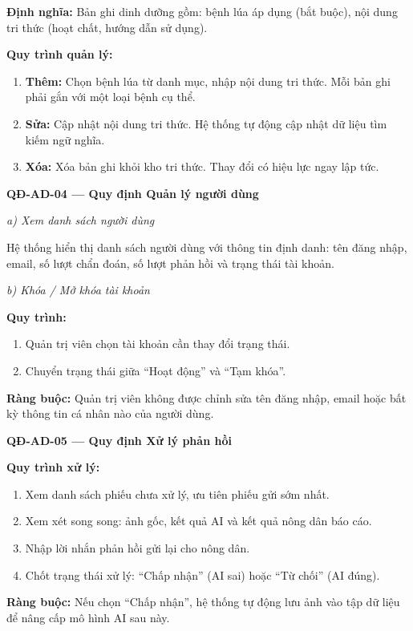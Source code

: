 \documentclass[12pt,a4paper]{article}
\begin{document}
\noindent\textbf{Định nghĩa:} Bản ghi dinh dưỡng gồm: bệnh lúa áp dụng (bắt buộc), nội dung tri thức (hoạt chất, hướng dẫn sử dụng).

\noindent\textbf{Quy trình quản lý:}
\begin{enumerate}
    \item \textbf{Thêm:} Chọn bệnh lúa từ danh mục, nhập nội dung tri thức. Mỗi bản ghi phải gắn với một loại bệnh cụ thể.
    \item \textbf{Sửa:} Cập nhật nội dung tri thức. Hệ thống tự động cập nhật dữ liệu tìm kiếm ngữ nghĩa.
    \item \textbf{Xóa:} Xóa bản ghi khỏi kho tri thức. Thay đổi có hiệu lực ngay lập tức.
\end{enumerate}

\vspace{0.3cm}
\noindent\textbf{QĐ-AD-04 --- Quy định Quản lý người dùng}

\noindent\textit{a) Xem danh sách người dùng}

Hệ thống hiển thị danh sách người dùng với thông tin định danh: tên đăng nhập, email, số lượt chẩn đoán, số lượt phản hồi và trạng thái tài khoản.

\noindent\textit{b) Khóa / Mở khóa tài khoản}

\noindent\textbf{Quy trình:}
\begin{enumerate}
    \item Quản trị viên chọn tài khoản cần thay đổi trạng thái.
    \item Chuyển trạng thái giữa ``Hoạt động'' và ``Tạm khóa''.
\end{enumerate}
\noindent\textbf{Ràng buộc:} Quản trị viên không được chỉnh sửa tên đăng nhập, email hoặc bất kỳ thông tin cá nhân nào của người dùng.

\vspace{0.3cm}
\noindent\textbf{QĐ-AD-05 --- Quy định Xử lý phản hồi}

\noindent\textbf{Quy trình xử lý:}
\begin{enumerate}
    \item Xem danh sách phiếu chưa xử lý, ưu tiên phiếu gửi sớm nhất.
    \item Xem xét song song: ảnh gốc, kết quả AI và kết quả nông dân báo cáo.
    \item Nhập lời nhắn phản hồi gửi lại cho nông dân.
    \item Chốt trạng thái xử lý: ``Chấp nhận'' (AI sai) hoặc ``Từ chối'' (AI đúng).
\end{enumerate}
\noindent\textbf{Ràng buộc:} Nếu chọn ``Chấp nhận'', hệ thống tự động lưu ảnh vào tập dữ liệu để nâng cấp mô hình AI sau này.
\end{document}
